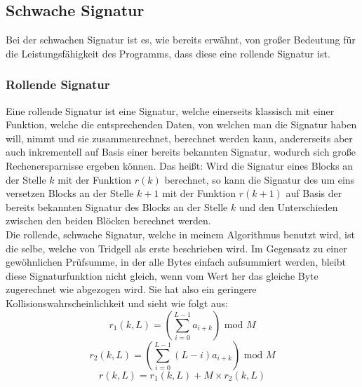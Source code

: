 \subsection{Schwache Signatur}
\label{sec:schwache_signatur}

Bei der schwachen Signatur ist es, wie bereits erwähnt, von großer Bedeutung für die Leistungsfähigkeit des Programms, dass diese eine
rollende Signatur ist.

\subsubsection{Rollende Signatur}
\label{sec:rollend}

Eine rollende Signatur ist eine Signatur, welche einerseits klassisch mit einer Funktion, welche die entsprechenden Daten, von welchen man die Signatur
haben will, nimmt und sie zusammenrechnet, berechnet werden kann, andererseits aber auch inkrementell auf Basis einer bereits bekannten Signatur, 
wodurch sich große Rechenersparnisse ergeben können. Das heißt: Wird die Signatur eines Blocks an der Stelle $k$ mit der Funktion $r(k)$ berechnet,
so kann die Signatur des um eins versetzen Blocks an der Stelle $k+1$ mit der Funktion $r(k+1)$ auf Basis der bereits bekannten Signatur des Blocks an
der Stelle $k$ und den Unterschieden zwischen den beiden Blöcken berechnet werden.
\\

Die rollende, schwache Signatur, welche in meinem Algorithmus benutzt wird, ist die selbe, welche von Tridgell als erste beschrieben wird\cite{Tridgell99}.
Im Gegensatz zu einer gewöhnlichen Prüfsumme, in der alle Bytes einfach aufsummiert werden, bleibt diese Signaturfunktion nicht gleich, wenn
vom Wert her das gleiche Byte zugerechnet wie abgezogen wird. Sie hat also ein geringere Kollisionswahrscheinlichkeit  und sieht wie folgt 
aus\cite{Tridgell99}:
\begin{equation}
    r_1(k,L) = (\sum_{i=0}^{L-1}a_{i+k}) \textrm{ mod } M 
\end{equation}
\begin{equation}
    r_2(k,L) = (\sum_{i=0}^{L-1}(L-i)a_{i+k}) \textrm{ mod } M 
\end{equation}
\begin{equation}
    r(k,L) = r_1(k,L) + M \times r_2(k,L)
    \label{eq:r}
\end{equation}

